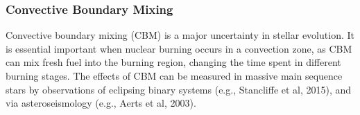 {\color{purple}
\subsubsection{Convective Boundary Mixing}
}


Convective boundary mixing (CBM) is a major uncertainty in stellar evolution. It is essential important when nuclear burning occurs in a convection zone, as CBM can mix fresh fuel into the burning region, changing the time spent in different burning stages. The effects of CBM can be measured in massive main sequence stars by observations of eclipsing binary systems (e.g., Stancliffe et al, 2015), and via asteroseismology (e.g., Aerts et al, 2003).

